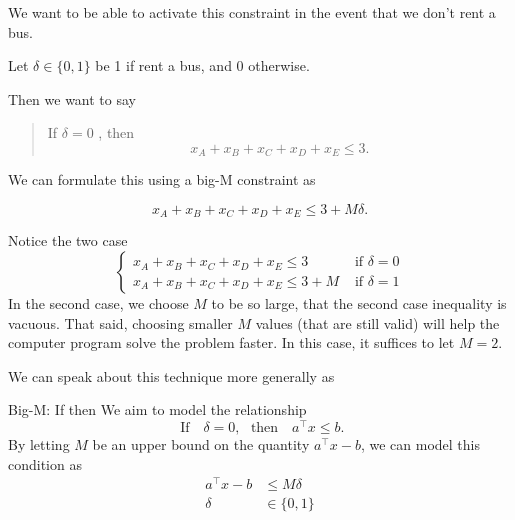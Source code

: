 We want to be able to activate this constraint in the event that we don't rent a bus.

Let $\delta \in \{0,1\}$ be 1 if rent a bus, and 0 otherwise.  

Then we want to say
\begin{quote}
If $\delta = 0$ , then 
$$
x_A + x_B + x_C + x_D + x_E \leq 3.
$$
\end{quote}

We can formulate this using a big-M constraint as

\begin{equation}
x_A + x_B + x_C + x_D + x_E \leq 3 + M \delta.
\end{equation}

Notice the two case
$$
\begin{cases}
x_A + x_B + x_C + x_D + x_E \leq 3  & \text{ if } \delta = 0\\
x_A + x_B + x_C + x_D + x_E \leq 3 +M & \text{ if } \delta = 1
\end{cases}
$$
In the second case, we choose $M$ to be so large, that the second case inequality is vacuous.    That said, choosing smaller $M$ values (that are still valid) will help the computer program solve the problem faster.  In this case, it suffices to let $M = 2$.

We can speak about this technique more generally as
\begin{general}{Big-M: If then}{}{}
We aim to model the relationship
\begin{equation}
\text{ If } \ \ \   \delta = 0, \ \ \  \text{then  } \ \ \ a^\top x \leq b.
\end{equation}
By letting $M$ be an upper bound on the quantity $a^\top x - b$, we can model this condition as 
\begin{equation}
\begin{split}
a^\top x - b& \leq M\delta\\
\delta & \in \{0,1\}
\end{split}
\end{equation}
\end{general}


